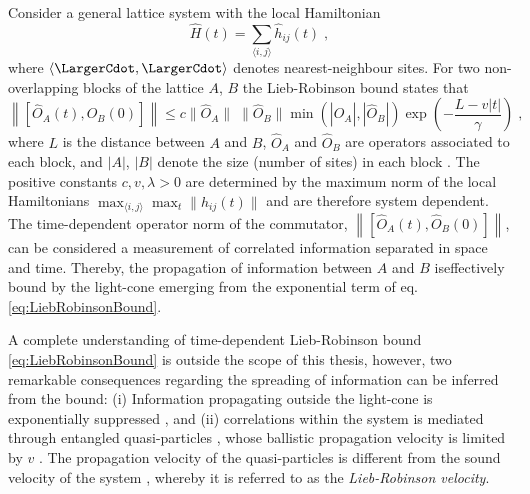 Consider a general lattice system with the local Hamiltonian
\begin{equation}
	\hat{H} (t) = \sum_{\langle i,j \rangle} \hat{h}_{ij}(t) \; ,
\end{equation}
where $\langle \LargerCdot , \LargerCdot \rangle$ denotes nearest-neighbour sites. For two non-overlapping blocks of the lattice $A$, $B$ the Lieb-Robinson bound states that
\begin{equation}
	\left\lVert \left[ \hat{O}_A (t) , \hat{O}_B (0) \right] \right\rVert \leq c \lVert \hat{O}_A \rVert \; \lVert \hat{O}_B \rVert
	\min \left( | \hat{O}_A | , | \hat{O}_B | \right) \exp \left(-  \frac{L - v |t|}{\gamma} \right) \; ,
	\label{eq:LiebRobinsonBound}
\end{equation}
where $L$ is the distance between $A$ and $B$, $\hat{O}_A$ and $\hat{O}_B $ are operators associated to each block, and $| A |$, $| B |$ denote the size (number of sites) in each block \cite{Bravyi2006}. The positive constants $c,v,\lambda > 0$ are determined by the maximum norm of the local Hamiltonians $\max_{\langle i,j \rangle} \max_{t}  \lVert \hat{h}_{ij} (t) \rVert $ and are therefore system dependent. The time-dependent operator norm of the commutator, $\left\lVert \left[ \hat{O}_A (t) , \hat{O}_B (0) \right] \right\rVert$, can be considered a measurement of correlated information separated in space and time. Thereby, the propagation of information between $A$ and $B$ iseffectively bound by the light-cone emerging from the exponential term of eq. \eqref{eq:LiebRobinsonBound}.

A complete understanding of time-dependent Lieb-Robinson bound \eqref{eq:LiebRobinsonBound} is outside the scope of this thesis, however, two remarkable consequences regarding the spreading of information can be inferred from the bound: (i) Information propagating outside the light-cone is exponentially suppressed \cite{Bravyi2006}, and (ii) correlations within the system is mediated through entangled quasi-particles \cite{Cheneau2012}, whose ballistic propagation velocity is limited by $v$ \cite{Calabrese2006}. The propagation velocity of the quasi-particles is different from the sound velocity of the system \cite{Lauchli2008}, whereby it is referred to as the \textit{Lieb-Robinson velocity}.

